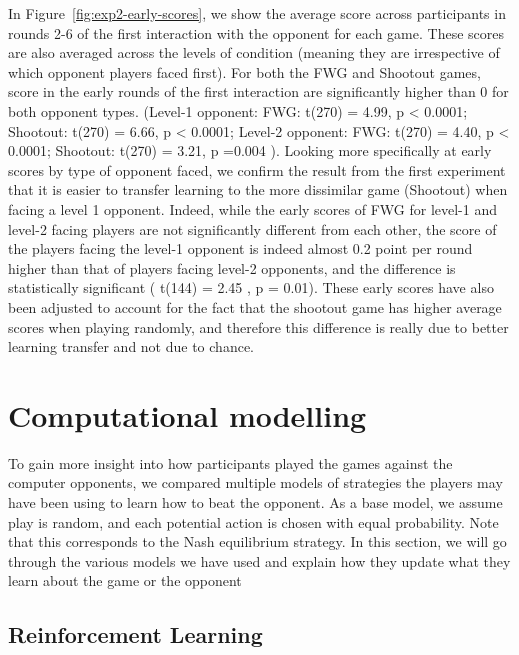 \documentclass[man,floatsintext]{apa6}
\begin{document}
In Figure~\ref{fig:exp2-early-scores}, we show the average score across participants in rounds 2-6 of the first interaction with the opponent for each game. These scores are also averaged across the levels of condition (meaning they are irrespective of which opponent players faced first). For both the FWG and Shootout games, score in the early rounds of the first interaction are significantly higher than 0 for both opponent types. (Level-1 opponent: FWG: t(270) = 4.99, p \textless{} 0.0001; Shootout: t(270) = 6.66, p \textless{} 0.0001; Level-2 opponent: FWG: t(270) = 4.40, p \textless{} 0.0001; Shootout: t(270) = 3.21, p =0.004 ). Looking more specifically at early scores by type of opponent faced, we confirm the result from the first experiment that it is easier to transfer learning to the more dissimilar game (Shootout) when facing a level 1 opponent. Indeed, while the early scores of FWG for level-1 and level-2 facing players are not significantly different from each other, the score of the players facing the level-1 opponent is indeed almost 0.2 point per round higher than that of players facing level-2 opponents, and the difference is statistically significant ( t(144) = 2.45 , p = 0.01). These early scores have also been adjusted to account for the fact that the shootout game has higher average scores when playing randomly, and therefore this difference is really due to better learning transfer and not due to chance.

\newpage

\hypertarget{computational-modelling}{%
\section{Computational modelling}\label{computational-modelling}}

To gain more insight into how participants played the games against the computer opponents, we compared multiple models of strategies the players may have been using to learn how to beat the opponent. As a base model, we assume play is random, and each potential action is chosen with equal probability. Note that this corresponds to the Nash equilibrium strategy. In this section, we will go through the various models we have used and explain how they update what they learn about the game or the opponent

\hypertarget{reinforcement-learning}{%
\subsection{Reinforcement Learning}\label{reinforcement-learning}}
\end{document}
